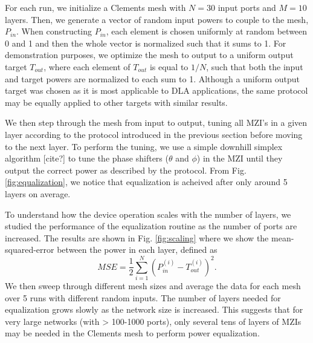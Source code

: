 \documentclass[%
 reprint,
 amsmath,amssymb,
 aps,
prstab,
floatfix,
]{revtex4-1}
\begin{document}
For each run, we initialize a Clements mesh with $N = 30$ input ports and $M = 10$ layers.  Then, we generate a vector of random input powers to couple to the mesh, $P_{in}$.  When constructing $P_{in}$, each element is chosen uniformly at random between 0 and 1 and then the whole vector is normalized such that it sums to 1.  For demonstration purposes, we optimize the mesh to output to a uniform output target $T_{out}$, where each element of $T_{out}$ is equal to $1/N$, such that both the input and target powers are normalized to each sum to 1.  Although a uniform output target was chosen as it is most applicable to DLA applications, the same protocol may be equally applied to other targets with similar results.

We then step through the mesh from input to output, tuning all MZI's in a given layer according to the protocol introduced in the previous section before moving to the next layer.  To perform the tuning, we use a simple downhill simplex algorithm [cite?] to tune the phase shifters ($\theta$ and $\phi$) in the MZI until they output the correct power as described by the protocol.  From Fig. \ref{fig:equalization}, we notice that equalization is acheived after only around 5 layers on average.

To understand how the device operation scales with the number of layers, we studied the performance of the equalization routine as the number of ports are increased.  The results are shown in Fig. \ref{fig:scaling} where we show the mean-squared-error between the power in each layer, defined as 
\begin{equation}
    MSE = \frac{1}{2}\sum_{i=1}^N \left( P_{in}^{(i)} - T_{out}^{(i)} \right)^2.
\end{equation}
We then sweep through different mesh sizes and average the data for each mesh over 5 runs with different random inputs.  The number of layers needed for equalization grows slowly as the network size is increased.  This suggests that for very large networks (with > 100-1000 ports), only several tens of layers of MZIs may be needed in the Clements mesh to perform power equalization.
\end{document}

